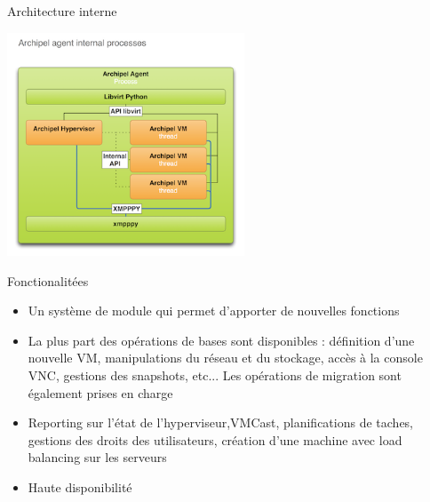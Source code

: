 
\begin{frame}{Architecture interne}
\begin{center}
\includegraphics[width=200pt]{images_presentation/intern.png}
\end{center}
\end{frame}

\begin{frame}{Fonctionalitées}
\begin{itemize}
\item Un système de module qui permet d'apporter de nouvelles fonctions
\pause
\item La plus part des opérations de bases sont disponibles : définition d'une nouvelle VM, manipulations du réseau et du stockage,
accès à la console VNC, gestions des snapshots, etc... 
Les opérations de migration sont également prises en charge
\pause
\item Reporting sur l'état de l'hyperviseur,VMCast, planifications de taches, gestions des droits des
utilisateurs, création d'une machine avec load balancing sur les serveurs
\pause
\item Haute disponibilité
\end{itemize}
\end{frame}


